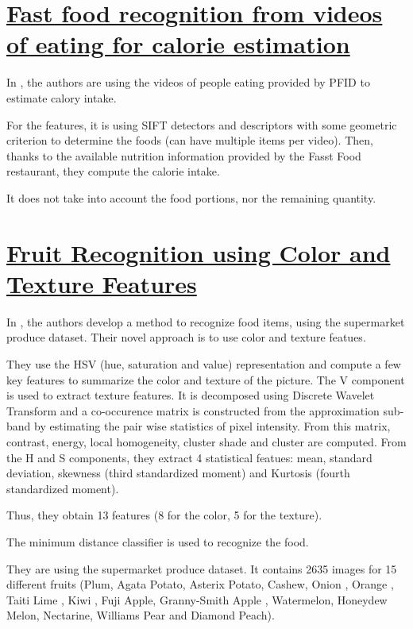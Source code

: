 \section{\href{http://ieeexplore.ieee.org/xpls/abs_all.jsp?arnumber=5202718}{Fast food recognition from videos of eating for calorie estimation}}

In \cite{Wen2009}, the authors are using the videos of people eating provided by PFID to estimate calory intake.

For the features, it is using SIFT detectors and descriptors with some geometric criterion to determine the foods (can have multiple items per video). Then, thanks to the available nutrition information provided by the Fasst Food restaurant, they compute the calorie intake.

It does not take into account the food portions, nor the remaining quantity.

\section{\href{http://cisjournal.org/archive/vol1no1/vol1no1_12.pdf}{Fruit Recognition using Color and Texture Features}}

In \cite{Arivazhagan2010}, the authors develop a method to recognize food items, using the supermarket produce dataset. Their novel approach is to use color and texture featues.

They use the HSV (hue, saturation and value) representation and compute a few key features to summarize the color and texture of the picture.
The V component is used to extract texture features. It is decomposed using Discrete Wavelet Transform and a co-occurence matrix is constructed from the approximation sub-band by estimating the pair wise statistics of pixel intensity. From this matrix, contrast, energy, local homogeneity, cluster shade and cluster are computed.
From the H and S components, they extract 4 statistical featues: mean, standard deviation, skewness (third standardized moment) and Kurtosis (fourth standardized moment).

Thus, they obtain 13 features (8 for the color, 5 for the texture).

The minimum distance classifier is used to recognize the food.

They are using the supermarket produce dataset. It contains 2635 images for 15 different fruits (Plum, Agata Potato, Asterix Potato, Cashew, Onion , Orange , Taiti Lime , Kiwi , Fuji Apple, Granny-Smith Apple , Watermelon, Honeydew Melon, Nectarine, Williams Pear and Diamond Peach).


